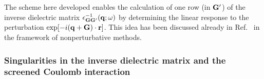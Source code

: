 \documentclass[twocolumn,prb,showpacs,superscriptaddress]{revtex4}
\def\w{\omega}
\def\H{\hat{H}}
\def\P{\hat{P}_{\rm occ}}
\def\E{\varepsilon}
\def\q{{\bf q}}
\def\k{{\bf k}}
\def\G{{\bf G}}
\def\Gp{{\bf G^\prime}}
\def\r{{\bf r}}
\begin{document}
The scheme here developed enables the calculation of one row (in $\Gp$) of the inverse 
dielectric matrix $\epsilon^{-1}_{\G\Gp}(\q;\w)$ by determining the linear response to the
perturbation ${\rm exp}[-i(\q+\G)\cdot\r]$. This idea has been discussed already
in Ref.\  in the framework of nonperturbative methods.


\subsubsection{Singularities in the inverse dielectric matrix and the screened Coulomb interaction}
\end{document}
